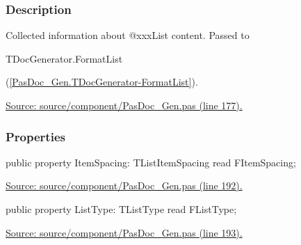 \documentclass{report}
\newif\ifpdf
\begin{document}
\subsubsection*{\large{\textbf{Description}}\normalsize\hspace{1ex}\hfill}
Collected information about @xxxList content. Passed to \begin{ttfamily}TDocGenerator.FormatList\end{ttfamily}(\ref{PasDoc_Gen.TDocGenerator-FormatList}).\par
\href{https://github.com/pasdoc/pasdoc/blob/master/source/component/PasDoc_Gen.pas#L177}{Source: source/component/PasDoc{\_}Gen.pas (line 177).}\subsubsection*{\large{\textbf{Properties}}\normalsize\hspace{1ex}\hfill}
\begin{list}{}{
\setlength{\itemindent}{0cm}
\setlength{\listparindent}{0cm}
\setlength{\leftmargin}{\evensidemargin}
\addtolength{\leftmargin}{\tmplength}
\settowidth{\labelsep}{X}
\addtolength{\leftmargin}{\labelsep}
\setlength{\labelwidth}{\tmplength}
}
\label{PasDoc_Gen.TListData-ItemSpacing}
\item[\textbf{ItemSpacing}\hfill]
\ifpdf
\begin{flushleft}
\fi
\begin{ttfamily}
public property ItemSpacing: TListItemSpacing read FItemSpacing;\end{ttfamily}

\ifpdf
\end{flushleft}
\fi


\par  \par
\href{https://github.com/pasdoc/pasdoc/blob/master/source/component/PasDoc_Gen.pas#L192}{Source: source/component/PasDoc{\_}Gen.pas (line 192).}\label{PasDoc_Gen.TListData-ListType}
\item[\textbf{ListType}\hfill]
\ifpdf
\begin{flushleft}
\fi
\begin{ttfamily}
public property ListType: TListType read FListType;\end{ttfamily}

\ifpdf
\end{flushleft}
\fi


\par  \par
\href{https://github.com/pasdoc/pasdoc/blob/master/source/component/PasDoc_Gen.pas#L193}{Source: source/component/PasDoc{\_}Gen.pas (line 193).}\end{list}
\end{document}
